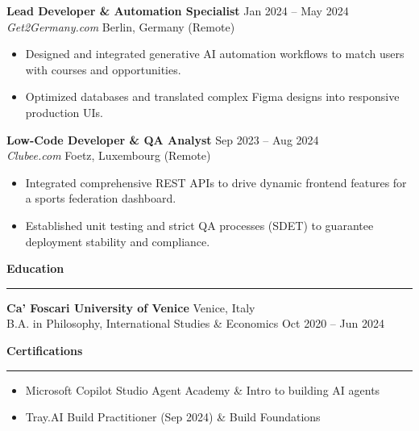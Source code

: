 \documentclass[10pt,a4paper]{article}
\begin{document}
\vspace{0.5em}
\noindent\textbf{Lead Developer \& Automation Specialist} \hfill Jan 2024 -- May 2024 \\
\textit{Get2Germany.com} \hfill Berlin, Germany (Remote)
\begin{itemize}[leftmargin=0.2in, itemsep=0pt]
    \item Designed and integrated generative AI automation workflows to match users with courses and opportunities.
    \item Optimized databases and translated complex Figma designs into responsive production UIs.
\end{itemize}

\vspace{0.5em}
\noindent\textbf{Low-Code Developer \& QA Analyst} \hfill Sep 2023 -- Aug 2024 \\
\textit{Clubee.com} \hfill Foetz, Luxembourg (Remote)
\begin{itemize}[leftmargin=0.2in, itemsep=0pt]
    \item Integrated comprehensive REST APIs to drive dynamic frontend features for a sports federation dashboard.
    \item Established unit testing and strict QA processes (SDET) to guarantee deployment stability and compliance.
\end{itemize}

\vspace{1em}
\noindent\textbf{\large Education}
\vspace{0.2em}
\hrule
\vspace{0.5em}
\noindent\textbf{Ca' Foscari University of Venice} \hfill Venice, Italy \\
B.A. in Philosophy, International Studies \& Economics \hfill Oct 2020 -- Jun 2024

\vspace{1em}
\noindent\textbf{\large Certifications}
\vspace{0.2em}
\hrule
\vspace{0.5em}
\begin{itemize}[leftmargin=0.15in, label={}]
    \item Microsoft Copilot Studio Agent Academy \& Intro to building AI agents
    \item Tray.AI Build Practitioner (Sep 2024) \& Build Foundations
\end{itemize}
\end{document}
